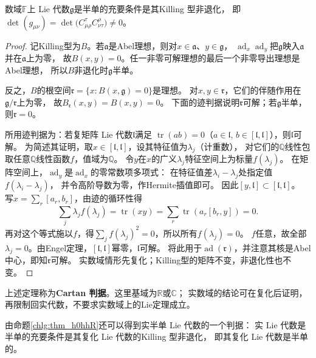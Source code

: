 \begin{theorem}
    数域$\mathbb{F}$上 Lie 代数$\mathfrak{g}$是半单的充要条件是其Killing 型非退化，
    即$\det(g_{\mu\nu}) =\det\bigl( C^\tau_{\mu\rho} C^\rho_{\nu\tau}\bigr) \neq 0$。
\end{theorem}
\begin{proof}
记Killing型为$B$。若$\mathfrak a$是Abel理想，则对$x\in\mathfrak a$、$y\in\mathfrak g$，
$\operatorname{ad}_x\operatorname{ad}_y$把$\mathfrak g$映入$\mathfrak a$并在$\mathfrak a$上为零，
故$B(x,y)=0$。任一非零可解理想的最后一个非零导出理想是Abel理想，
所以$B$非退化时$\mathfrak g$半单。

反之，$B$的根空间$\mathfrak r=\{x:B(x,\mathfrak g)=0\}$是理想。
对$x,y\in\mathfrak r$，它们的伴随作用在$\mathfrak g/\mathfrak r$上为零，
故$B_{\mathfrak r}(x,y)=B(x,y)=0$。
下面的迹判据说明$\mathfrak r$可解；若$\mathfrak g$半单，则$\mathfrak r=0$。

所用迹判据为：若复矩阵 Lie 代数$\mathfrak l$满足
$\operatorname{tr}(ab)=0$（$a\in\mathfrak l$, $b\in[\mathfrak l,\mathfrak l]$），则$\mathfrak l$可解。
为简述其证明，取$x\in[\mathfrak l,\mathfrak l]$，设其特征值为$\lambda_j$（计重数），
对它们的$\mathbb Q$线性包取任意$\mathbb Q$线性函数$f$，值域为$\mathbb Q$。
令$y$在$x$的广义$\lambda_j$特征空间上为标量$f(\lambda_j)$。
在矩阵空间上，$\operatorname{ad}_y$是$\operatorname{ad}_x$的零常数项多项式：
在特征值差$\lambda_i-\lambda_j$处指定值$f(\lambda_i-\lambda_j)$，
并令高阶导数为零，作Hermite插值即可。
因此$[y,\mathfrak l]\subset[\mathfrak l,\mathfrak l]$。
写$x=\sum_r[a_r,b_r]$，由迹的循环性得
\[
 \sum_j\lambda_j f(\lambda_j)=\operatorname{tr}(xy)
 =\sum_r\operatorname{tr}(a_r[b_r,y])=0 .
\]
再对这个等式施以$f$，得$\sum_j f(\lambda_j)^2=0$，所以所有$f(\lambda_j)=0$。
$f$任意，故全部$\lambda_j=0$。由Engel定理，$[\mathfrak l,\mathfrak l]$幂零，$\mathfrak l$可解。
将此用于$\operatorname{ad}(\mathfrak r)$，并注意其核是Abel中心，即知$\mathfrak r$可解。
实数域情形先复化；Killing型的矩阵不变，非退化性也不变。
\end{proof}

上述定理称为\textbf{Cartan 判据}。这里基域为$\mathbb R$或$\mathbb C$；
实数域的结论可在复化后证明，再限制回实代数，不要求实数域上的Lie定理成立。

由命题\ref{chlg:thm_h0hhR}还可以得到实半单 Lie 代数的一个判据：
实 Lie 代数是半单的充要条件是其复化 Lie 代数的Killing 型非退化，
即其复化 Lie 代数是半单的。

